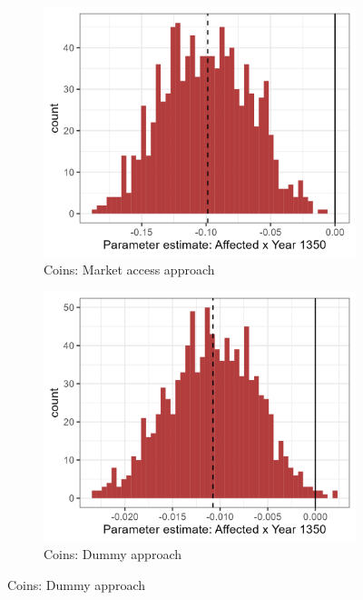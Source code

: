 \begin{figure}
    \centering
    \caption{Distribution of parameter estimates in 1350  (matched sample)}
    \begin{subfigure}[b]{0.45\textwidth}
        \centering
        \caption{Coins: Market access approach} \label{fig:distri_a_match_norm}
        \includegraphics[width=\textwidth]{Plots/Regression_plots/arch_MA_coins_matched_boot_norm.png}
    \end{subfigure}
    \hfill
    \begin{subfigure}[b]{0.45\textwidth}
        \centering
        \caption{Coins: Dummy approach} \label{fig:distri_b_match_norm}
        \includegraphics[width=\textwidth]{Plots/Regression_plots/arch_dummy_coins_matched_boot_norm.png}

\end{subfigure}
\end{figure}

